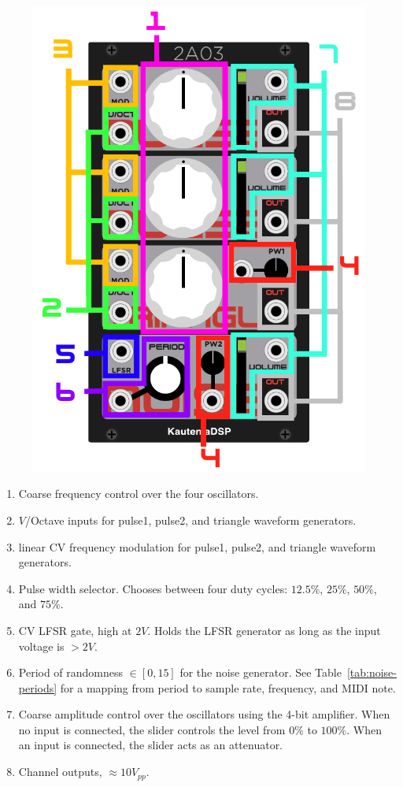 \documentclass[12pt,letter]{article}
\begin{document}
\begin{figure}[!htp]
\centering
\includegraphics{2A03-Manual}
\end{figure}

\begin{enumerate}
  \item Coarse frequency control over the four oscillators.
  \item $V$/Octave inputs for pulse1, pulse2, and triangle waveform generators.
  \item linear CV frequency modulation for pulse1, pulse2, and triangle waveform generators.
  \item Pulse width selector. Chooses between four duty cycles: $12.5\%$, $25\%$, $50\%$, and $75\%$.
  \item CV LFSR gate, high at $2V$. Holds the LFSR generator as long as the input voltage is $>2V$.
  \item Period of randomness $\in [0, 15]$ for the noise generator. See Table~\ref{tab:noise-periods} for a mapping from period to sample rate, frequency, and MIDI note.
  \item Coarse amplitude control over the oscillators using the 4-bit amplifier. When no input is connected, the slider controls the level from $0\%$ to $100\%$. When an input is connected, the slider acts as an attenuator.
  \item Channel outputs, ${\approx}10V_{pp}$.
\end{enumerate}
\end{document}
